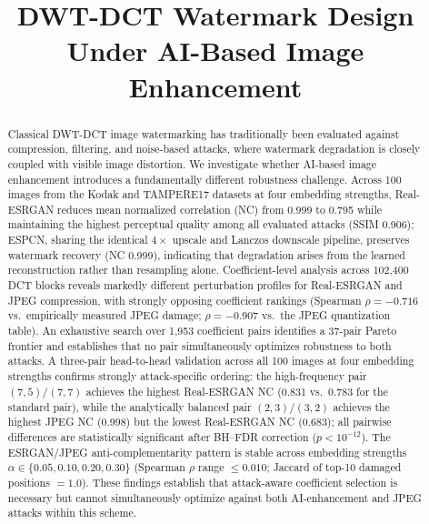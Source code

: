 \documentclass[conference]{IEEEtran}
\begin{document}
\title{DWT-DCT Watermark Design Under AI-Based Image Enhancement}

\author{
}

\maketitle

\begin{abstract}
Classical DWT-DCT image watermarking has traditionally been evaluated
against compression, filtering, and noise-based attacks, where watermark
degradation is closely coupled with visible image distortion. We
investigate whether AI-based image enhancement introduces a fundamentally
different robustness challenge. Across 100 images from the Kodak and
TAMPERE17 datasets at four embedding strengths, Real-ESRGAN reduces mean
normalized correlation (NC) from 0.999 to 0.795 while maintaining the
highest perceptual quality among all evaluated attacks (SSIM 0.906);
ESPCN, sharing the identical $4\times$ upscale and Lanczos downscale
pipeline, preserves watermark recovery (NC 0.999), indicating that
degradation arises from the learned reconstruction rather than resampling
alone. Coefficient-level analysis across 102,400 DCT blocks reveals
markedly different perturbation profiles for Real-ESRGAN and JPEG
compression, with strongly opposing coefficient rankings (Spearman
$\rho = -0.716$ vs.\ empirically measured JPEG damage; $\rho = -0.907$
vs.\ the JPEG quantization table). An exhaustive search over 1,953
coefficient pairs identifies a 37-pair Pareto frontier and establishes
that no pair simultaneously optimizes robustness to both attacks. A
three-pair head-to-head validation across all 100 images at four
embedding strengths confirms strongly attack-specific ordering: the
high-frequency pair $(7,5)/(7,7)$ achieves the highest Real-ESRGAN NC
(0.831 vs.\ 0.783 for the standard pair), while the analytically
balanced pair $(2,3)/(3,2)$ achieves the highest JPEG NC (0.998) but
the lowest Real-ESRGAN NC (0.683); all pairwise differences are
statistically significant after BH--FDR correction ($p < 10^{-12}$).
The ESRGAN/JPEG anti-complementarity pattern is stable across embedding
strengths $\alpha \in \{0.05, 0.10, 0.20, 0.30\}$ (Spearman $\rho$
range $\leq 0.010$; Jaccard of top-10 damaged positions $= 1.0$).
These findings establish that attack-aware coefficient selection is
necessary but cannot simultaneously optimize against both
AI-enhancement and JPEG attacks within this scheme.
\end{abstract}
\end{document}
